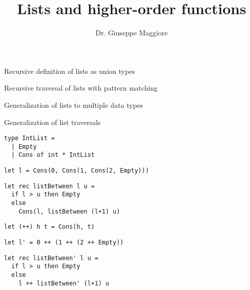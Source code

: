 \documentclass{beamer}
\title{Lists and higher-order functions}
\author{Dr. Giuseppe Maggiore}
\institute{Hogeschool Rotterdam \\ 
Rotterdam, Netherlands}
\date{}
\begin{document}
\maketitle

\begin{slide}{
\item Recursive definition of lists as union types
\item Recursive traversal of lists with pattern matching
\item Generalization of lists to multiple data types
\item Generalization of list traversals
}\end{slide}

\begin{frame}[fragile]
\begin{lstlisting}
type IntList =
  | Empty
  | Cons of int * IntList
\end{lstlisting}
\end{frame}

\begin{frame}[fragile]
\begin{lstlisting}
let l = Cons(0, Cons(1, Cons(2, Empty)))
\end{lstlisting}
\end{frame}

\begin{frame}[fragile]
\begin{lstlisting}
let rec listBetween l u =
  if l > u then Empty
  else
    Cons(l, listBetween (l+1) u)
\end{lstlisting}
\end{frame}

\begin{frame}[fragile]
\begin{lstlisting}
let (++) h t = Cons(h, t)
\end{lstlisting}
\end{frame}

\begin{frame}[fragile]
\begin{lstlisting}
let l' = 0 ++ (1 ++ (2 ++ Empty))
\end{lstlisting}
\end{frame}

\begin{frame}[fragile]
\begin{lstlisting}
let rec listBetween' l u =
  if l > u then Empty
  else
    l ++ listBetween' (l+1) u
\end{lstlisting}
\end{frame}
\end{document}
